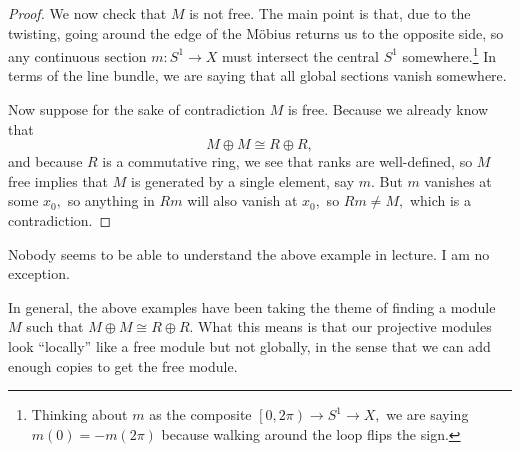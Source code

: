\documentclass[../notes.tex]{subfiles}
\begin{document}
\begin{proof}
	We now check that $M$ is not free. The main point is that, due to the twisting, going around the edge of the M\"obius returns us to the opposite side, so any continuous section $m:S^1\to X$ must intersect the central $S^1$ somewhere.\footnote{Thinking about $m$ as the composite $\left[0,2\pi\right)\to S^1\to X,$ we are saying $m(0)=-m(2\pi)$ because walking around the loop flips the sign.} In terms of the line bundle, we are saying that all global sections vanish somewhere.
	
	Now suppose for the sake of contradiction $M$ is free. Because we already know that
	\[M\oplus M\cong R\oplus R,\]
	and because $R$ is a commutative ring, we see that ranks are well-defined, so $M$ free implies that $M$ is generated by a single element, say $m.$ But $m$ vanishes at some $x_0,$ so anything in $Rm$ will also vanish at $x_0,$ so $Rm\ne M,$ which is a contradiction.
\end{proof}
\begin{remark}
	Nobody seems to be able to understand the above example in lecture. I am no exception.
\end{remark}
In general, the above examples have been taking the theme of finding a module $M$ such that $M\oplus M\cong R\oplus R.$ What this means is that our projective modules look ``locally'' like a free module but not globally, in the sense that we can add enough copies to get the free module.

\end{document}
